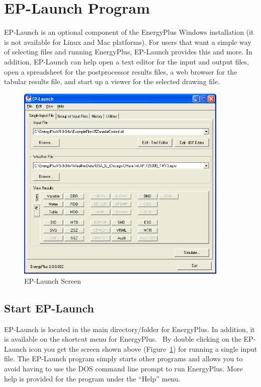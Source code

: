 \section{EP-Launch Program}\label{ep-launch-program}

EP-Launch is an optional component of the EnergyPlus Windows installation (it is not available for Linux and Mac platforms). For users that want a simple way of selecting files and running EnergyPlus, EP-Launch provides this and more. In addition, EP-Launch can help open a text editor for the input and output files, open a spreadsheet for the postprocessor results files, a web browser for the tabular results file, and start up a viewer for the selected drawing file.

\begin{figure}[hbtp] %
\centering
\includegraphics[width=0.9\textwidth, height=0.9\textheight, keepaspectratio=true]{media/image004.png}
\caption{EP-Launch Screen \protect \label{fig:ep-launch-screen}}
\end{figure}

\subsection{Start EP-Launch}\label{start-ep-launch}

EP-Launch is located in the main directory/folder for EnergyPlus. In addition, it is available on the shortcut menu for EnergyPlus.~ By double clicking on the EP-Launch icon you get the screen shown above (Figure~\ref{fig:ep-launch-screen}) for running a single input file. The EP-Launch program simply starts other programs and allows you to avoid having to use the DOS command line prompt to run EnergyPlus. More help is provided for the program under the ``Help'' menu.

